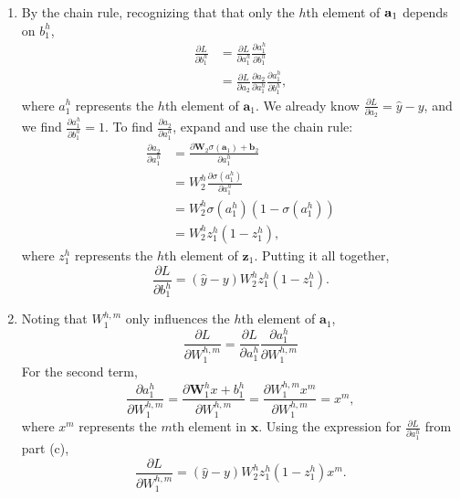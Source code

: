 \documentclass[submit]{harvardml}
\begin{document}
\begin{enumerate}
\begin{enumerate}
		\item By the chain rule, recognizing that that only the $h$th element of $\bold{a}_1$ depends on $b_1^h$,
		\begin{align*}
			\frac{\partial L}{\partial b_1^h} &= \frac{\partial L}{\partial a_1^h} \frac{\partial a_1^h}{\partial b_1^h} \\
			&= \frac{\partial L}{\partial a_2} \frac{\partial a_2}{\partial a_1^h} \frac{\partial a_1^h}{\partial b_1^h},
		\end{align*}
		where $a_1^h$ represents the $h$th element of $\mathbf{a}_1$. We already know $\frac{\partial L}{\partial a_2} = \hat y - y$, and we find $\frac{\partial a_1^h}{\partial b_1^h} = 1$. To find $\frac{\partial a_2}{\partial a_1^h}$, expand and use the chain rule:
		\begin{align*}
			\frac{\partial a_2}{\partial a_1^h} &= \frac{\partial \mathbf{W}_2\sigma (\mathbf{a}_1) + \mathbf{b}_2}{\partial a_1^h} \\
			&= W_2^h \frac{\partial \sigma(a_1^h)}{\partial a_1^h} \\
			&= W_2^h \sigma(a_1^h)(1 - \sigma(a_1^h)) \\
			&= W_2^h z_1^h (1 - z_1^h),
		\end{align*}
		where $z_1^h$ represents the $h$th element of $\mathbf{z}_1$. Putting it all together,
		$$\frac{\partial L}{\partial b_1^h} = (\hat y - y)W_2^h z_1^h (1 - z_1^h).$$
				
		\item Noting that $W_1^{h,m}$ only influences the $h$th element of $\mathbf{a}_1$,
		$$\frac{\partial L}{\partial W_1^{h,m}} = \frac{\partial L}{\partial a_1^h} \frac{\partial a_1^h}{\partial W_1^{h,m}}$$
		For the second term,
		$$\frac{\partial a_1^h}{\partial W_1^{h,m}} = \frac{\partial \mathbf{W}_1^h x + b_1^h}{\partial W_1^{h,m}} = \frac{\partial W_1^{h, m} x^m}{\partial W_1^{h,m}} = x^m,$$
		where $x^m$ represents the $m$th element in $\mathbf{x}$.
		Using the expression for $\frac{\partial L}{\partial a_1^h}$ from part (c),
		$$\frac{\partial L}{\partial W_1^{h,m}} = (\hat y - y)W_2^h z_1^h (1 - z_1^h) x^m.$$
		
	\end{enumerate}
	
\end{enumerate}



\newpage
\end{document}
